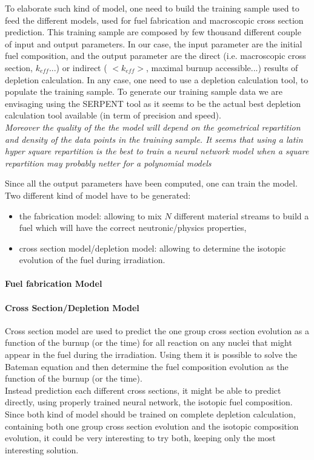 \documentclass[dvips,12pt]{article}
\begin{document}
 
To elaborate such kind of model, one need to build the training sample used to feed the different models, used for fuel fabrication and macroscopic cross section prediction.
This training sample are composed by few thousand different couple of input and output parameters. In our case, the input parameter are the initial fuel composition, and the output parameter are the direct (i.e. macroscopic cross section, $k_{eff}$...) or indirect ( $<k_{eff}>$, maximal burnup accessible...) results of depletion calculation. 
In any case, one need to use a depletion calculation tool, to populate the training sample. 
To generate our training sample data we are envisaging using the SERPENT tool as it seems to be the actual best depletion calculation tool available (in term of precision and speed).%
\\
\textit{Moreover the quality of the the model will depend on the geometrical repartition and density of the data points in the training sample.
It seems that using a latin hyper square repartition \cite{} is the best to train a neural network model when a square repartition may probably netter for a polynomial models } %

Since all the output parameters have been computed, one can train the model. Two different kind of model have to be generated: 
\begin{itemize}
\item the fabrication model: allowing to mix $N$ different material streams to build a fuel which will have the correct neutronic/physics properties,
\item cross section model/depletion model: allowing to determine the isotopic evolution of the fuel during irradiation.
\end{itemize}

\paragraph{Fuel fabrication Model\\}	



\paragraph{Cross Section/Depletion Model\\}
Cross section model are used to predict the one group cross section evolution as a function of the burnup (or the time) for all reaction on any nuclei that might appear in the fuel during the irradiation.
Using them it is possible to solve the Bateman equation and then determine the fuel composition evolution as the function of the burnup (or the time).\\
Instead prediction each different cross sections, it might be able to predict directly, using properly trained neural network, the isotopic fuel composition.\\
Since both kind of model should be trained on complete depletion calculation, containing both one group cross section evolution and the isotopic composition evolution, it could be very interesting to try both, keeping only the most interesting solution.
\end{document}
